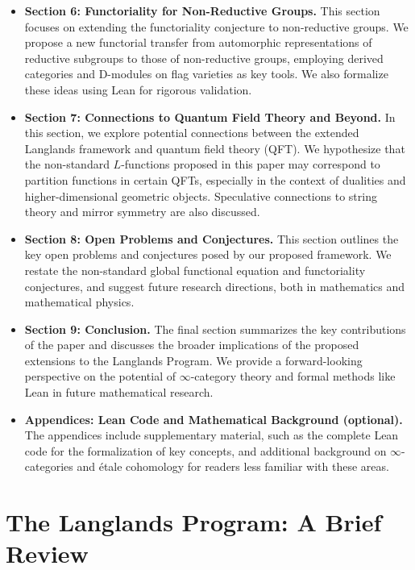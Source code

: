 \documentclass{article}
\theoremstyle{remark}
\begin{document}
\begin{itemize}
    \item \textbf{Section 6: Functoriality for Non-Reductive Groups.}
    This section focuses on extending the functoriality conjecture to non-reductive groups. We propose a new functorial transfer from automorphic representations of reductive subgroups to those of non-reductive groups, employing derived categories and D-modules on flag varieties as key tools. We also formalize these ideas using Lean for rigorous validation.
    
    \item \textbf{Section 7: Connections to Quantum Field Theory and Beyond.}
    In this section, we explore potential connections between the extended Langlands framework and quantum field theory (QFT). We hypothesize that the non-standard $L$-functions proposed in this paper may correspond to partition functions in certain QFTs, especially in the context of dualities and higher-dimensional geometric objects. Speculative connections to string theory and mirror symmetry are also discussed.

    \item \textbf{Section 8: Open Problems and Conjectures.}
    This section outlines the key open problems and conjectures posed by our proposed framework. We restate the non-standard global functional equation and functoriality conjectures, and suggest future research directions, both in mathematics and mathematical physics.
    
    \item \textbf{Section 9: Conclusion.}
    The final section summarizes the key contributions of the paper and discusses the broader implications of the proposed extensions to the Langlands Program. We provide a forward-looking perspective on the potential of $\infty$-category theory and formal methods like Lean in future mathematical research.
    
    \item \textbf{Appendices: Lean Code and Mathematical Background (optional).}
    The appendices include supplementary material, such as the complete Lean code for the formalization of key concepts, and additional background on $\infty$-categories and étale cohomology for readers less familiar with these areas.
\end{itemize}

\section{The Langlands Program: A Brief Review}
\end{document}
